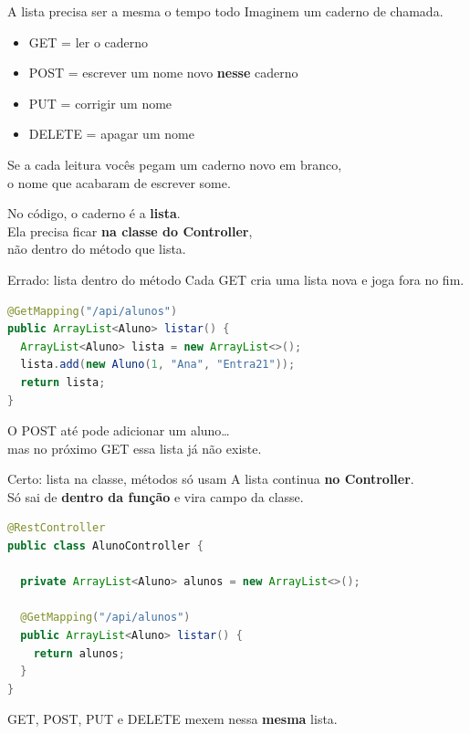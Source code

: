 \documentclass[aspectratio=169,11pt]{beamer}
\begin{document}
\begin{frame}{A lista precisa ser a mesma o tempo todo}
  Imaginem um caderno de chamada.

  \vspace{0.5em}
  \begin{itemize}
    \item GET = ler o caderno
    \item POST = escrever um nome novo \textbf{nesse} caderno
    \item PUT = corrigir um nome
    \item DELETE = apagar um nome
  \end{itemize}

  \vspace{0.6em}
  Se a cada leitura vocês pegam um caderno novo em branco,\\
  o nome que acabaram de escrever some.

  \vspace{0.4em}
  No código, o caderno é a \textbf{lista}.\\
  Ela precisa ficar \textbf{na classe do Controller},\\
  não dentro do método que lista.
\end{frame}

\begin{frame}[fragile]{Errado: lista dentro do método}
  Cada GET cria uma lista nova e joga fora no fim.

\begin{lstlisting}[language=Java,basicstyle=\ttfamily\footnotesize]
@GetMapping("/api/alunos")
public ArrayList<Aluno> listar() {
  ArrayList<Aluno> lista = new ArrayList<>();
  lista.add(new Aluno(1, "Ana", "Entra21"));
  return lista;
}
\end{lstlisting}

  \vspace{0.4em}
  O POST até pode adicionar um aluno\ldots\\
  mas no próximo GET essa lista já não existe.
\end{frame}

\begin{frame}[fragile]{Certo: lista na classe, métodos só usam}
  A lista continua \textbf{no Controller}.\\
  Só sai de \textbf{dentro da função} e vira campo da classe.

\begin{lstlisting}[language=Java,basicstyle=\ttfamily\footnotesize]
@RestController
public class AlunoController {

  private ArrayList<Aluno> alunos = new ArrayList<>();

  @GetMapping("/api/alunos")
  public ArrayList<Aluno> listar() {
    return alunos;
  }
}
\end{lstlisting}

  GET, POST, PUT e DELETE mexem nessa \textbf{mesma} lista.
\end{frame}
\end{document}
